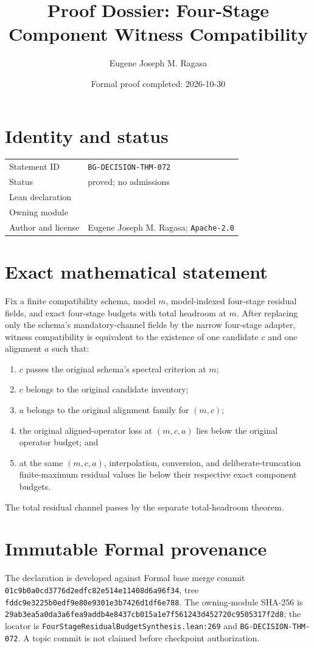\documentclass[10pt]{article}
\title{Proof Dossier: Four-Stage Component Witness Compatibility}
\author{Eugene Joseph M. Ragasa}
\date{Formal proof completed: 2026-10-30}
\begin{document}
\raggedright
\maketitle
\section{Identity and status}
\begin{tabularx}{\textwidth}{@{}lY@{}}
\toprule
Statement ID & \texttt{BG-DECISION-THM-072} \\
Status & proved; no admissions \\
Lean declaration &  \\
Owning module &  \\
Author and license & Eugene Joseph M. Ragasa; \texttt{Apache-2.0} \\
\bottomrule
\end{tabularx}

\section{Exact mathematical statement}
Fix a finite compatibility schema, model $m$, model-indexed four-stage residual fields, and exact
four-stage budgets with total headroom at $m$. After replacing only the schema's mandatory-channel
fields by the narrow four-stage adapter, witness compatibility is equivalent to the existence of
one candidate $c$ and one alignment $a$ such that:
\begin{enumerate}
\item $c$ passes the original schema's spectral criterion at $m$;
\item $c$ belongs to the original candidate inventory;
\item $a$ belongs to the original alignment family for $(m,c)$;
\item the original aligned-operator loss at $(m,c,a)$ lies below the original operator budget; and
\item at the same $(m,c,a)$, interpolation, conversion, and deliberate-truncation finite-maximum
residual values lie below their respective exact component budgets.
\end{enumerate}
The total residual channel passes by the separate total-headroom theorem.

\section{Immutable Formal provenance}
The declaration is developed against Formal base merge commit
\texttt{01c9b0a0cd3776d2edfc82e514e11408d6a96f34}, tree
\texttt{fddc9e3225b0edf9e80e9301e3b7426d1df6e788}. The owning-module SHA-256 is
\texttt{29ab3ea5a0da3a6fea9addb4e8437cb015a1e7f561243d452720c9505317f2d8}; the locator is
\texttt{FourStageResidualBudgetSynthesis.lean:269} and \texttt{BG-DECISION-THM-072}. A topic
commit is not claimed before checkpoint authorization.
\end{document}
